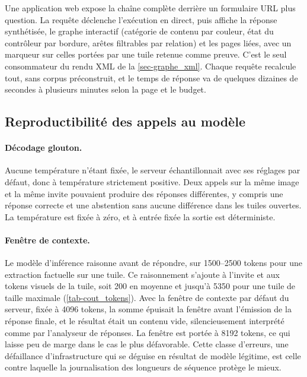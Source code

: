 Une application web expose la chaîne complète derrière un formulaire
\og URL plus question\fg{}. La requête déclenche l'exécution en direct, puis
affiche la réponse synthétisée, le graphe interactif (catégorie de contenu par
couleur, état du contrôleur par bordure, arêtes filtrables par relation) et les
pages liées, avec un marqueur sur celles portées par une tuile retenue comme
preuve. C'est le seul consommateur du rendu XML de la \cref{sec-graphe_xml}. Chaque
requête recalcule tout, sans corpus préconstruit, et le temps de réponse va de
quelques dizaines de secondes à plusieurs minutes selon la page et le budget.
 
\subsection{Reproductibilité des appels au modèle}
\label{sec-impl_repro}
 
\paragraph{Décodage glouton.} Aucune température n'étant fixée, le serveur
échantillonnait avec ses réglages par défaut, donc à température strictement
positive. Deux appels sur la même image et la même invite pouvaient produire des
réponses différentes, y compris une réponse correcte et une abstention sans aucune
différence dans les tuiles ouvertes. La température est fixée à zéro, et à entrée
fixée la sortie est déterministe.
 
\paragraph{Fenêtre de contexte.} Le modèle d'inférence raisonne avant de répondre,
sur \numrange{1500}{2500} tokens pour une extraction factuelle sur une tuile. Ce
raisonnement s'ajoute à l'invite et aux tokens visuels de la tuile, soit \num{200}
en moyenne et jusqu'à \num{5350} pour une tuile de taille maximale
(\cref{tab-cout_tokens}). Avec la fenêtre de contexte par défaut du serveur, fixée
à \num{4096} tokens, la somme épuisait la fenêtre avant l'émission de la réponse
finale, et le résultat était un contenu vide, silencieusement interprété comme
 par l'analyseur de réponses. La fenêtre est portée à \num{8192} tokens,
ce qui laisse peu de marge dans le cas le plus défavorable. Cette classe d'erreurs,
une défaillance d'infrastructure qui se déguise en résultat de modèle légitime, est
celle contre laquelle la journalisation des longueurs de séquence protège le mieux.
 
